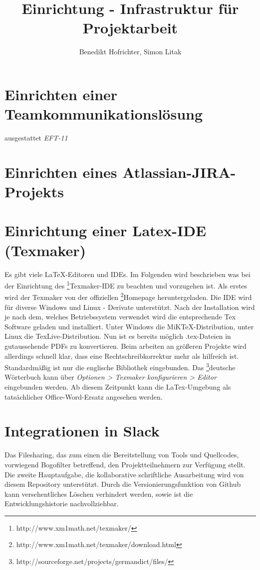 \documentclass{article}
\begin{document}
\title{Einrichtung - Infrastruktur für Projektarbeit}
\author{Benedikt Hofrichter, Simon Litak}
\maketitle

\section{Einrichten einer Teamkommunikationslösung}
ausgestattet
\emph{EFT-11}

\section{Einrichten eines Atlassian-JIRA-Projekts}

\section{Einrichtung einer Latex-IDE (Texmaker)}
Es gibt viele LaTeX-Editoren und IDEs. Im Folgenden wird beschrieben was bei der Einrichtung des \footnote{\label{foot:2}http://www.xm1math.net/texmaker/}Texmaker-IDE zu beachten und vorzugehen ist. Als erstes wird der Texmaker von der offiziellen \footnote{\label{foot:3}http://www.xm1math.net/texmaker/download.html}Homepage heruntergeladen. Die IDE wird für diverse Windows und Linux - Derivate unterstützt. Nach der Installation wird je nach dem, welches Betriebssystem verwendet wird die entsprechende Tex Software geladen und installiert. Unter Windows die MiKTeX-Distribution, unter Linux die TexLive-Distribution. 
Nun ist es bereits möglich .tex-Dateien in gutaussehende PDFs zu konvertieren. Beim arbeiten an größeren Projekte wird allerdings schnell klar, dass eine Rechtschreibkorrektur mehr als hilfreich ist. Standardmäßig ist nur die englische Bibliothek eingebunden. Das \footnote{\label{foot:4}http://sourceforge.net/projects/germandict/files/}deutsche Wörterbuch kann über \emph{Optionen > Texmaker konfigurieren > Editor} eingebunden werden. Ab diesem Zeitpunkt kann die LaTex-Umgebung als tatsächlicher Office-Word-Ersatz angesehen werden.   

\section{Integrationen in Slack}
Das Filesharing, das zum einen die Bereitstellung von Tools und Quellcodes, vorwiegend Bogofilter betreffend, den Projektteilnehmern zur Verfügung stellt. Die zweite Hauptaufgabe, die kollaborative schriftliche Ausarbeitung wird von diesem Repository unterstützt. Durch die Versionierungsfunktion von Github kann versehentliches Löschen verhindert werden, sowie ist die Entwicklungshistorie nachvollziehbar.
\end{document}
